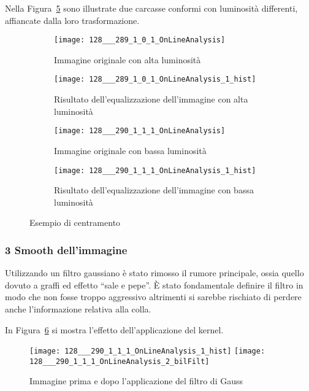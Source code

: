 Nella Figura~\ref{fig:equalizzazione} sono illustrate due carcasse conformi con luminosità differenti, affiancate dalla loro trasformazione.
\begin{figure}[ht] %
  \begin{center}
    \begin{subfigure}{.49\linewidth}
      \centering\texttt{[image: 128\_\_\_289\_1\_0\_1\_OnLineAnalysis]}
      \caption{Immagine originale con alta luminosità}
      \label{fig:p2_originale_lum}
    \end{subfigure}
    \begin{subfigure}{.49\linewidth}
      \centering\texttt{[image: 128\_\_\_289\_1\_0\_1\_OnLineAnalysis\_1\_hist]}
      \caption{Risultato dell'equalizzazione dell'immagine con alta luminosità}
      \label{fig:p2_equalizzata_lum}
    \end{subfigure}

    \begin{subfigure}{.49\linewidth}
      \centering\texttt{[image: 128\_\_\_290\_1\_1\_1\_OnLineAnalysis]}
      \caption{Immagine originale con bassa luminosità}
      \label{fig:p2_originale_scura}
    \end{subfigure}
    \begin{subfigure}{.49\linewidth}
      \centering\texttt{[image: 128\_\_\_290\_1\_1\_1\_OnLineAnalysis\_1\_hist]}
      \caption{Risultato dell'equalizzazione dell'immagine con bassa luminosità}
      \label{fig:p2_equalizzata_scura}
    \end{subfigure}

  \end{center}
  \caption{Esempio di centramento}
  \label{fig:equalizzazione}
\end{figure}

\subsubsection{3 Smooth dell'immagine}
Utilizzando un filtro gaussiano è stato rimosso il rumore principale, ossia quello dovuto a graffi ed effetto ``sale e pepe''.
È stato fondamentale definire il filtro in modo che non fosse troppo aggressivo altrimenti si sarebbe rischiato di perdere anche l'informazione relativa alla colla.

In Figura~\ref{fig:smooth} si mostra l'effetto dell'applicazione del kernel.
\begin{figure}[ht] %
  \begin{center}
    \texttt{[image: 128\_\_\_290\_1\_1\_1\_OnLineAnalysis\_1\_hist]}
    \texttt{[image: 128\_\_\_290\_1\_1\_1\_OnLineAnalysis\_2\_bilFilt]}
    \caption{Immagine prima e dopo l'applicazione del filtro di Gauss}
    \label{fig:smooth}
  \end{center}
\end{figure}


